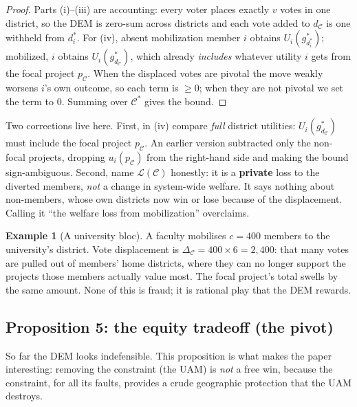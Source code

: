\documentclass[11pt,letterpaper]{article}
\theoremstyle{definition}
\newtheorem{example}{Example}[section]
\theoremstyle{plain}
\theoremstyle{remark}
\newcommand{\votes}{v}
\begin{document}
\begin{proof}
Parts (i)--(iii) are accounting: every voter places exactly $\votes$ votes in one district, so the
DEM is zero-sum across districts and each vote added to $d_\mathcal{C}$ is one withheld from
$d_i^*$. For (iv), absent mobilization member $i$ obtains $U_i(g^*_{d_i^*})$; mobilized, $i$ obtains
$U_i(g^*_{d_\mathcal{C}})$, which already \emph{includes} whatever utility $i$ gets from the focal
project $p_\mathcal{C}$. When the displaced votes are pivotal the move weakly worsens $i$'s own
outcome, so each term is $\ge0$; when they are not pivotal we set the term to $0$. Summing over
$\mathcal{C}^*$ gives the bound.
\end{proof}

\begin{watchout}
Two corrections live here. First, in (iv) compare \emph{full} district utilities:
$U_i(g^*_{d_\mathcal{C}})$ must include the focal project $p_\mathcal{C}$. An earlier version
subtracted only the non-focal projects, dropping $u_i(p_\mathcal{C})$ from the right-hand side and
making the bound sign-ambiguous. Second, name $\mathcal{L}(\mathcal{C})$ honestly: it is a
\textbf{private} loss to the diverted members, \emph{not} a change in system-wide welfare. It says
nothing about non-members, whose own districts now win or lose because of the displacement. Calling
it ``the welfare loss from mobilization'' overclaims.
\end{watchout}

\begin{example}[A university bloc]
A faculty mobilises $c=400$ members to the university's district. Vote displacement is
$\Delta_\mathcal{C}=400\times6=2{,}400$: that many votes are pulled out of members' home districts,
where they can no longer support the projects those members actually value most. The focal project's
total swells by the same amount. None of this is fraud; it is rational play that the DEM rewards.
\end{example}

\subsection{Proposition 5: the equity tradeoff (the pivot)}

So far the DEM looks indefensible. This proposition is what makes the paper interesting: removing
the constraint (the UAM) is \emph{not} a free win, because the constraint, for all its faults,
provides a crude geographic protection that the UAM destroys.
\end{document}
